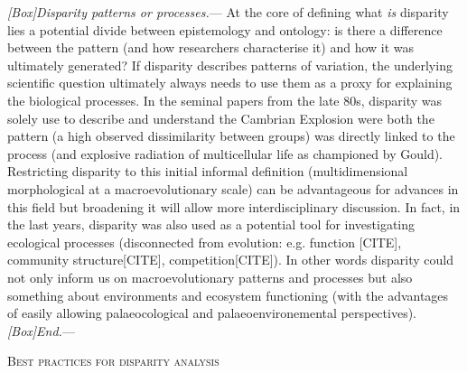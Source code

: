 \documentclass[12pt,letterpaper]{article}
\renewcommand{\section}[1]{%
\bigskip
\begin{center}
\begin{Large}
\normalfont\scshape #1
\medskip
\end{Large}
\end{center}}
\renewcommand{\subsubsection}[1]{%
\vspace{2ex}
\noindent
\textit{#1.}---}
\begin{document}
\subsubsection{[Box]Disparity patterns or processes}
\label{box_semantic}
At the core of defining what \textit{is} disparity lies a potential divide between epistemology and ontology:
is there a difference between the pattern (and how researchers characterise it) and how it was ultimately generated?
If disparity describes patterns of variation, the underlying scientific question ultimately always needs to use them as a proxy for explaining the biological processes.
In the seminal papers from the late 80s, disparity was solely use to describe and understand the Cambrian Explosion were both the pattern (a high observed dissimilarity between groups) was directly linked to the process (and explosive radiation of multicellular life as championed by Gould).
Restricting disparity to this initial informal definition (multidimensional morphological at a macroevolutionary scale) can be advantageous for advances in this field but broadening it will allow more interdisciplinary discussion.
In fact, in the last years, disparity was also used as a potential tool for investigating ecological processes (disconnected from evolution: e.g. function [CITE], community structure[CITE], competition[CITE]).
In other words disparity could not only inform us on macroevolutionary patterns and processes but also something about environments and ecosystem functioning (with the advantages of easily allowing palaeocological and palaeoenvironemental perspectives).
\subsubsection{[Box]End}

\section{Best practices for disparity analysis}
\end{document}
